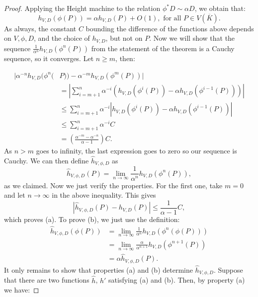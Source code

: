 \documentclass[a4paper, 12pt]{amsart}
\theoremstyle{definition}
\theoremstyle{plain}
\theoremstyle{plain}
\theoremstyle{plain}
\theoremstyle{plain}
\theoremstyle{remark}
\theoremstyle{remark}
\theoremstyle{plain}
\begin{document}
	\begin{proof}
		Applying the Height machine to the relation $\phi^*D\sim\alpha D$, we obtain that:
		\begin{equation*}
			h_{V,D}(\phi(P))=\alpha h_{V,D}(P)+O(1), \text{ for all } P\in V(\overline{K}).
		\end{equation*}
		As always, the constant $C$ bounding the difference of the functions above depends on $V,\phi,D$, and the choice of $h_{V,D}$, but not on $P$. Now we will show that the sequence $\frac{1}{\alpha^n}h_{V,D}(\phi^n(P))$ from the statement of the theorem is a Cauchy sequence, so it converges. Let $n\ge m$, then:
		
		\begin{align*}
			|\alpha^{-n}h_{V,D}(\phi^n(&P))-\alpha^{-m}h_{V,D}(\phi^m(P))|\\
			&=\left|\sum_{i=m+1}^n\alpha^{-i}(h_{V,D}(\phi^i(P))-\alpha h_{V,D}(\phi^{i-1}(P)))\right|\\
			&\le\sum_{i=m+1}^n\alpha^{-i}\left|h_{V,D}(\phi^i(P))-\alpha h_{V,D}(\phi^{i-1}(P))\right|\\
			&\le\sum_{i=m+1}^n\alpha^{-i}C\\
			&=\left(\frac{\alpha^{-m}-\alpha^{-n}}{\alpha-1}\right)C.
		\end{align*}
		As $n>m$ goes to infinity, the last expression goes to zero so our sequence is Cauchy. We can then define $\hat{h}_{V,\phi,D}$ as
		\begin{equation*}
			\hat{h}_{V,\phi,D}(P)=\lim\limits_{n\to\infty}\frac{1}{\alpha^n}h_{V,D}(\phi^n(P)),
		\end{equation*}
		as we claimed. Now we just verify the properties. For the first one, take $m=0$ and let $n\to\infty$ in the above inequality. This gives
		\begin{equation*}
			|\hat{h}_{V,\phi,D}(P)-h_{V,D}(P)|\le\frac{1}{\alpha-1}C,
		\end{equation*}
		which proves (a). To prove (b), we just use the definition:
		\begin{align*}
			\hat{h}_{V,\phi,D}(\phi(P))&=\lim\limits_{n\to\infty}\frac{1}{\alpha^n}h_{V,D}(\phi^n(\phi(P)))\\
			&=\lim\limits_{n\to\infty}\frac{\alpha}{\alpha^{n+1}}h_{V,D}(\phi^{n+1}(P))\\
			&=\alpha\hat{h}_{V,\phi,D}(P).
		\end{align*}
		It only remains to show that properties (a) and (b) determine $\hat{h}_{V,\phi,D}$. Suppose that there are two functions $\hat{h}$, $\hat{h}'$ satisfying (a) and (b). Then, by property (a) we have:

\end{proof}
\end{document}
